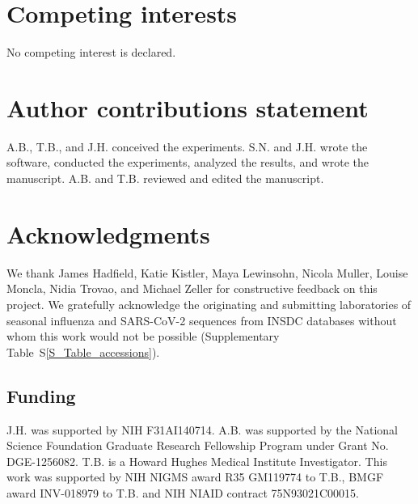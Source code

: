 \documentclass[webpdf,contemporary,large,single]{oup-authoring-template}%
\theoremstyle{thmstyleone}%
\theoremstyle{thmstyletwo}%
\theoremstyle{thmstylethree}%
\begin{document}
\section*{Competing interests}

No competing interest is declared.

\section*{Author contributions statement}

A.B., T.B., and J.H. conceived the experiments.
S.N. and J.H. wrote the software, conducted the experiments, analyzed the results, and wrote the manuscript.
A.B. and T.B. reviewed and edited the manuscript.

\section*{Acknowledgments}

We thank James Hadfield, Katie Kistler, Maya Lewinsohn, Nicola Muller, Louise Moncla, Nidia Trovao, and Michael Zeller for constructive feedback on this project.
We gratefully acknowledge the originating and submitting laboratories of seasonal influenza and SARS-CoV-2 sequences from INSDC databases without whom this work would not be possible (Supplementary Table~S\ref{S_Table_accessions}).

\subsection*{Funding}

J.H. was supported by NIH F31AI140714.
A.B. was supported by the National Science Foundation Graduate Research Fellowship Program under Grant No.
DGE-1256082.
T.B. is a Howard Hughes Medical Institute Investigator.
This work was supported by NIH NIGMS award R35 GM119774 to T.B., BMGF award INV-018979 to T.B. and NIH NIAID contract 75N93021C00015.

\nolinenumbers





\end{document}
